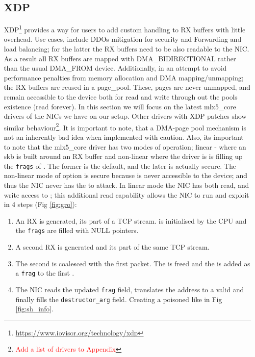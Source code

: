 \subsection{XDP}\label{sec:xdp}
XDP\footnote{\url{https://www.iovisor.org/technology/xdp}} provides a way for users to add custom handling to RX buffers with little overhead. Use cases, include DDOs mitigation for security and Forwarding and load balancing; for the latter the RX buffers need to be also readable to the NIC. As a result all RX buffers are mapped with DMA\_BIDIRECTIONAL rather than the usual DMA\_FROM device. Additionally, in an attempt to avoid performance penalties from memory allocation \cite{xdp} and DMA mapping/unmapping; the RX buffers are reused in a page\_pool\cite{page_pool}. These, pages are never unmapped, and remain accessible to the device both for read and write through out the pools existence (read forever). In this section we will focus on the latest mlx5\_core drivers of the NICs we have on our setup. Other drivers with XDP patches show similar behaviour\footnote{\textcolor{red}{Add a list of drivers to Appendix}}. It is important to note, that a DMA-page pool mechanism is not an inherently bad idea when implemented with caution\cite{MSMT18}. Also, its important to note that the mlx5\_core driver has two modes of operation; linear - where an skb is built around an RX buffer and non-linear where the driver is is filling up the \texttt{frags} of \shinfo. The former is the default, and the later is actually secure. The non-linear mode of option is secure because \shinfo is never accessible to the device; and thus the NIC never has the \oportunity to attack.\newline
In linear mode the NIC has both read, and write access to \shinfo; this additional read capability allows the NIC to run and exploit in 4 steps (Fig \ref{fig:gro}):
\begin{enumerate}
    \item An RX \skb is generated, its part of a TCP stream. \shinfo is initialised by the CPU and the \texttt{frags} are filled with NULL pointers.
    \item A second RX \skb is generated and its part of the same TCP stream.
    \item The second \skb is coalesced with the first packet. The \skb is freed and the \data is added as a \texttt{frag} to the first \skb.
    \item The NIC reads the updated \texttt{frag} field, translates the \page address to a valid \kva and finally fills the \texttt{destructor\_arg} field. Creating a poisoned \skb like in Fig \ref{fig:sh_info}.
\end{enumerate}
